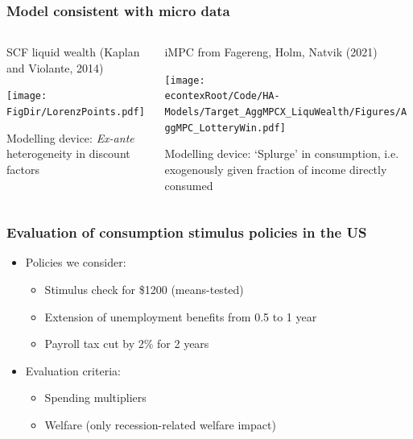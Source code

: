 \documentclass[pdflatex,aspectratio=169]{beamer}
\begin{document}
\begin{frame}
	\frametitle{Model consistent with micro data}
	
	\hypertarget{ConsistentWithMicroData}{}
	
	\begin{columns}
		\begin{column}{0.4\textwidth}
			SCF liquid wealth (Kaplan and Violante, 2014) 
			
			\texttt{[image: \\FigDir/LorenzPoints.pdf]}
			
			Modelling device: \textit{Ex-ante} heterogeneity in discount factors
			
		\end{column}
	
		\pause
		
		\begin{column}{0.4\textwidth}  	
			iMPC from Fagereng, Holm, Natvik (2021)	
			
			\texttt{[image: \\econtexRoot/Code/HA-Models/Target\_AggMPCX\_LiquWealth/Figures/AggMPC\_LotteryWin.pdf]}
			
			Modelling device: `Splurge' in consumption, i.e. exogenously given fraction of income directly consumed
		\end{column}
	\end{columns}
	
\end{frame}




\begin{frame}
\frametitle{Evaluation of consumption stimulus policies in the US}
\begin{itemize}
\itemsep = .5\bigskipamount 
\item Policies we consider: 
\begin{itemize}
	\itemsep = .25\bigskipamount 
	\item Stimulus check for \$1200 (means-tested)
	\item Extension of unemployment benefits from 0.5 to 1 year
	\item Payroll tax cut by 2\% for 2 years
\end{itemize}
\bigskip
\item Evaluation criteria: 
\begin{itemize}
	\itemsep = .25\bigskipamount 
	\item Spending multipliers
	\item Welfare (only recession-related welfare impact)
\end{itemize}
\end{itemize}
\end{frame}
\end{document}
